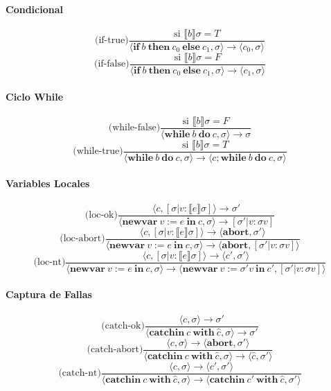 \documentclass[a4paper,11pt]{article}
\begin{document}
\paragraph{Condicional}
\[
\text{(if-true)} \frac{\text{si } \llbracket b \rrbracket \sigma = T}{\langle \mathbf{if} \ b \ \mathbf{then} \ c_0 \ \mathbf{else} \ c_1, \sigma \rangle \to \langle c_0, \sigma \rangle}
\]
\[
\text{(if-false)} \frac{\text{si } \llbracket b \rrbracket \sigma = F}{\langle \mathbf{if} \ b \ \mathbf{then} \ c_0 \ \mathbf{else} \ c_1, \sigma \rangle \to \langle c_1, \sigma \rangle}
\]

\paragraph{Ciclo While}
\[
\text{(while-false)} \frac{\text{si } \llbracket b \rrbracket \sigma = F}{\langle \mathbf{while} \ b \ \mathbf{do} \ c, \sigma \rangle \to \sigma}
\]
\[
\text{(while-true)} \frac{\text{si } \llbracket b \rrbracket \sigma = T}{\langle \mathbf{while} \ b \ \mathbf{do} \ c, \sigma \rangle \to \langle c; \mathbf{while} \ b \ \mathbf{do} \ c, \sigma \rangle}
\]

\paragraph{Variables Locales}
\[
\text{(loc-ok)} \frac{\langle c, [\sigma | v : \llbracket e \rrbracket \sigma] \rangle \to \sigma'}{\langle \mathbf{newvar} \ v := e \ \mathbf{in} \ c, \sigma \rangle \to [\sigma' | v : \sigma v]}
\]
\[
\text{(loc-abort)} \frac{\langle c, [\sigma | v : \llbracket e \rrbracket \sigma] \rangle \to \langle \mathbf{abort}, \sigma' \rangle}{\langle \mathbf{newvar} \ v := e \ \mathbf{in} \ c, \sigma \rangle \to \langle \mathbf{abort}, [\sigma' | v : \sigma v] \rangle}
\]
\[
\text{(loc-nt)} \frac{\langle c, [\sigma | v : \llbracket e \rrbracket \sigma] \rangle \to \langle c', \sigma' \rangle}{\langle \mathbf{newvar} \ v := e \ \mathbf{in} \ c, \sigma \rangle \to \langle \mathbf{newvar} \ v := \sigma' v \ \mathbf{in} \ c', [\sigma' | v : \sigma v] \rangle}
\]

\paragraph{Captura de Fallas}
\[
\text{(catch-ok)} \frac{\langle c, \sigma \rangle \to \sigma'}{\langle \mathbf{catchin} \ c \ \mathbf{with} \ \hat{c}, \sigma \rangle \to \sigma'}
\]
\[
\text{(catch-abort)} \frac{\langle c, \sigma \rangle \to \langle \mathbf{abort}, \sigma' \rangle}{\langle \mathbf{catchin} \ c \ \mathbf{with} \ \hat{c}, \sigma \rangle \to \langle \hat{c}, \sigma' \rangle}
\]
\[
\text{(catch-nt)} \frac{\langle c, \sigma \rangle \to \langle c', \sigma' \rangle}{\langle \mathbf{catchin} \ c \ \mathbf{with} \ \hat{c}, \sigma \rangle \to \langle \mathbf{catchin} \ c' \ \mathbf{with} \ \hat{c}, \sigma' \rangle}
\]
\end{document}
